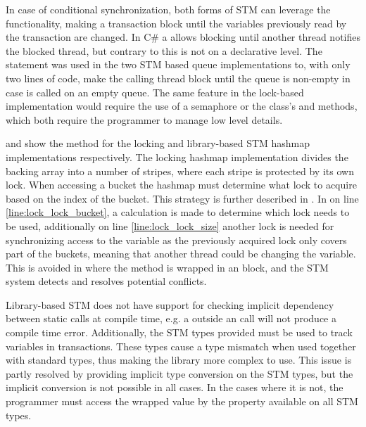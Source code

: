In case of conditional synchronization, both forms of \ac{STM} can leverage the  functionality, making a transaction block until the variables previously read by the transaction are changed. In C\# a  allows blocking until another thread notifies the blocked thread, but contrary to  this is not on a declarative level. The  statement was used in the two \ac{STM} based queue implementations to, with only two lines of code, make the calling thread block until the queue is non-empty in case  is called on an empty queue. The same feature in the lock-based implementation would require the use of a semaphore or the  class's  and  methods, which both require the programmer to manage low level details.

 and  show the  method for the locking and library-based \ac{STM} hashmap implementations respectively. 
The locking hashmap implementation divides the backing array into a number of stripes, where each stripe is protected by its own lock. When accessing a bucket the hashmap must determine what lock to acquire based on the index of the bucket. This strategy is further described in . In  on line \ref{line:lock_lock_bucket}, a calculation is made to determine which lock needs to be used, additionally on line \ref{line:lock_lock_size} another lock is needed for synchronizing access to the  variable as the previously acquired lock only covers part of the buckets, meaning that another thread could be changing the  variable. This is avoided in  where the method is wrapped in an  block, and the \ac{STM} system detects and resolves potential conflicts.

Library-based \ac{STM} does not have support for checking implicit dependency between static calls at compile time, e.g. a  outside an  call will not produce a compile time error. Additionally, the \ac{STM} types provided must be used to track variables in transactions. These types cause a type mismatch when used together with standard types, thus making the library more complex to use. This issue is partly resolved by providing implicit type conversion on the \ac{STM} types, but the implicit conversion is not possible in all cases. In the cases where it is not, the programmer must access the wrapped value by the  property available on all \ac{STM} types.

